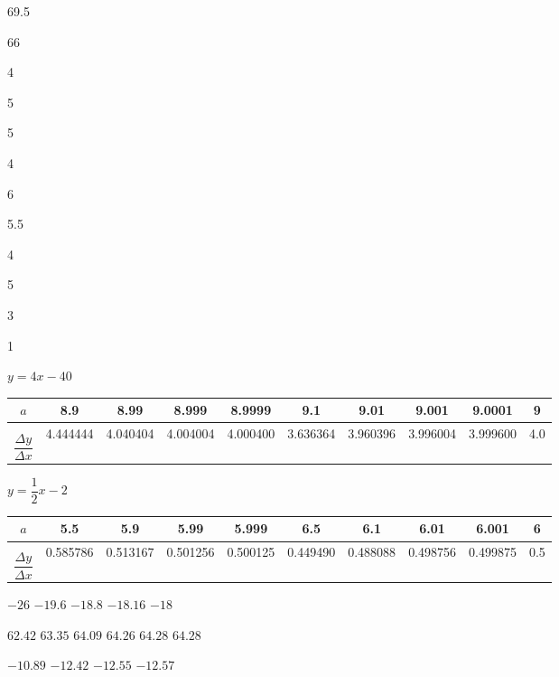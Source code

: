 \documentclass{book}
\begin{document}
\begin{appendices}
\begin{enumerate}[!HW!]
\begin{multicols}{6}
\item 69.5
\item 66

\item 4
\item 5
\item 5
\end{multicols}
\begin{multicols}{7}
\item 4
\item 6
\item 5.5
\item 4
\item 5
\item 3
\item 1
\end{multicols}

\itemspade $y=4x-40$\\
\begin{tabular}{c||ccccccccc}
$a$ & 8.9 & 8.99 & 8.999 & 8.9999 & 9.1 & 9.01 & 9.001 & 9.0001 & 9 \\\hline
$\overset{\phantom{+}}{\dfrac{\Delta y}{\Delta x}}$ & 4.444444 & 4.040404 & 4.004004 & 4.000400 &  3.636364 & 3.960396 & 3.996004 & 3.999600 & 4.0
\end{tabular} 

\itemspade $y=\dfrac{1}{2}x-2$\\
\begin{tabular}{c||ccccccccc}
$a$ & 5.5 & 5.9 & 5.99 & 5.999 & 6.5 & 6.1 & 6.01 & 6.001 & 6 \\\hline
$\overset{\phantom{+}}{\dfrac{\Delta y}{\Delta x}}$ &  0.585786 & 0.513167 & 0.501256 & 0.500125 &  0.449490 & 0.488088 & 0.498756 & 0.499875 & 0.5
\end{tabular} 

\begin{multicols}{5}
\itemspade $-26$
\itemspade $-19.6$
\itemspade $-18.8$
\itemspade $-18.16$
\itemspade $-18$
\end{multicols}

\begin{multicols}{6}
\itemspade $62.42$
\itemspade $63.35$
\itemspade $64.09$
\itemspade $64.26$
\itemspade $64.28$
\itemspade $64.28$
\end{multicols}

\begin{multicols}{5}
\itemspade  $-10.89$
\itemspade  $-12.42$
\itemspade $-12.55$
\itemspade  $-12.57$
\end{multicols}
\end{enumerate}
\vspace{-15 pt}


\end{appendices}
\end{document}

